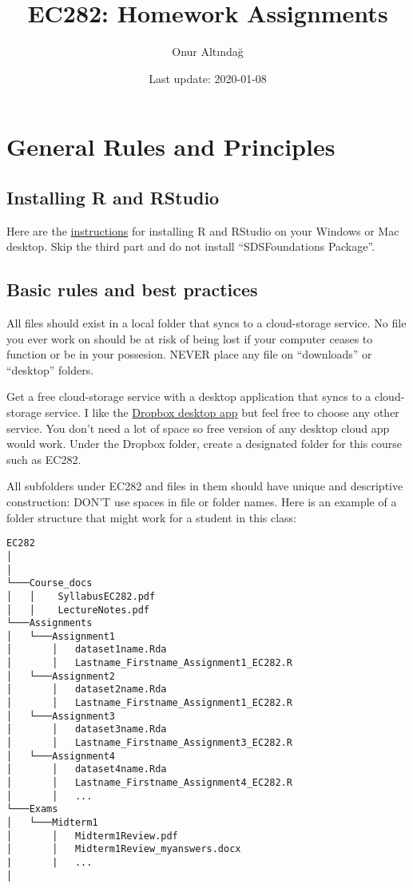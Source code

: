 \documentclass[]{book}
\title{EC282: Homework Assignments}
\author{Onur Altındağ}
\date{Last update: 2020-01-08}
\begin{document}
\maketitle

{
\setcounter{tocdepth}{1}
\tableofcontents
}
\chapter{General Rules and
Principles}\label{general-rules-and-principles}

\section{Installing R and RStudio}\label{installing-r-and-rstudio}

Here are the
\href{https://courses.edx.org/courses/UTAustinX/UT.7.01x/3T2014/56c5437b88fa43cf828bff5371c6a924/}{instructions}
for installing R and RStudio on your Windows or Mac desktop. Skip the
third part and do not install ``SDSFoundations Package''.

\section{Basic rules and best
practices}\label{basic-rules-and-best-practices}

All files should exist in a local folder that syncs to a cloud-storage
service. No file you ever work on should be at risk of being lost if
your computer ceases to function or be in your possesion. NEVER place
any file on ``downloads'' or ``desktop'' folders.

Get a free cloud-storage service with a desktop application that syncs
to a cloud-storage service. I like the
\href{https://help.dropbox.com/installs-integrations/desktop/desktop-application-overview}{Dropbox
desktop app} but feel free to choose any other service. You don't need a
lot of space so free version of any desktop cloud app would work. Under
the Dropbox folder, create a designated folder for this course such as
EC282.

All subfolders under EC282 and files in them should have unique and
descriptive construction: DON'T use spaces in file or folder names. Here
is an example of a folder structure that might work for a student in
this class:

\begin{verbatim}
EC282
│  
│
└───Course_docs
│   │    SyllabusEC282.pdf
│   │    LectureNotes.pdf 
└───Assignments
│   └───Assignment1
│       │   dataset1name.Rda
│       │   Lastname_Firstname_Assignment1_EC282.R
│   └───Assignment2
│       │   dataset2name.Rda
│       │   Lastname_Firstname_Assignment1_EC282.R
│   └───Assignment3
│       │   dataset3name.Rda
│       │   Lastname_Firstname_Assignment3_EC282.R
│   └───Assignment4
│       │   dataset4name.Rda
│       │   Lastname_Firstname_Assignment4_EC282.R
│       │   ...
└───Exams
│   └───Midterm1
│       │   Midterm1Review.pdf
│       │   Midterm1Review_myanswers.docx
|       |   ...
│   
\end{verbatim}
\end{document}
